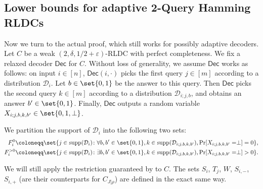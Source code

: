 \documentclass[10pt,a4paper]{article}
\theoremstyle{remark}
\newcommand{\eps}{\ensuremath{\varepsilon}}
\def\+#1{\mathcal{#1}}
\newcommand{\Dec}{\ensuremath{\mathsf{Dec}}\xspace}
\providecommand{\supp}{\operatorname{supp}}
\begin{document}
\subsection{Lower bounds for adaptive 2-Query Hamming RLDCs} \label{subsec:adaptive-2qRLDC}
Now we turn to the actual proof, which still works for possibly adaptive decoders. Let $C$ be a weak $(2,\delta,1/2+\eps)$-RLDC with perfect completeness. We fix a relaxed decoder $\Dec$ for $C$. Without loss of generality, we assume $\Dec$ works as follows: on input $i \in [n]$, $\Dec(i,\cdot)$ picks the first query $j \in [m]$ according to a distribution $\+D_i$. Let $b \in \set{0,1}$ be the answer to this query. Then $\Dec$ picks the second query $k \in [m]$ according to a distribution $\+D_{i;j,b}$, and obtains an answer $b' \in \set{0,1}$. Finally, $\Dec$ outputs a random variable $X_{i;j,b,k,b'}\in \set{0,1,\perp}$. 

We partition the support of $\+D_i$ into the following two sets:
\begin{align*}
	F_i^{0} &\coloneqq \set{j \in \supp(\+D_i) \colon \forall b,b' \in \set{0,1}, k \in \supp(\+D_{i;j,b,k,b'}), \Pr[X_{i;j,b,k,b'} = \perp] = 0}, \\
	F_i^{>0} &\coloneqq \set{j \in \supp(\+D_i) \colon \exists b,b' \in \set{0,1}, k \in \supp(\+D_{i;j,b,k,b'}), \Pr[X_{i;j,b,k,b'}=\perp] > 0}.
\end{align*}

We will still apply the restriction guaranteed by  to $C$. The sets $S_i$, $T_j$, $W$, $S_{i,-}$, $S_{i,+}$ (are their counterparts for $C_{J|\rho}$) are defined in the exact same way.
\end{document}
